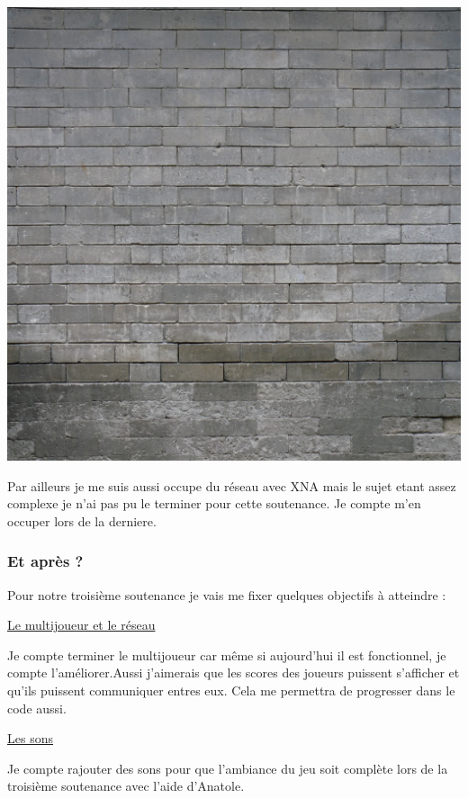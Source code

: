 \documentclass{article}
\begin{document}
\begin{center}
\includegraphics[scale=0.5]{mur_brique.png}
\end{center}
\par
Par ailleurs je me suis aussi occupe du réseau avec XNA mais le sujet etant assez complexe je n'ai pas pu le terminer pour cette soutenance. Je compte m'en occuper lors de la derniere.
\subsubsection{Et après ?}
\par
Pour notre troisième soutenance je vais me fixer quelques objectifs à atteindre :
\newline

\par
\underline{Le multijoueur et le réseau}
\newline
\par
Je compte terminer le multijoueur car même si aujourd'hui il est fonctionnel, je compte l'améliorer.Aussi j'aimerais que les scores des joueurs puissent s'afficher et qu'ils puissent communiquer entres eux. Cela me permettra de progresser dans le code aussi.
\newline

\par
\underline{Les sons}
\newline
\par
Je compte rajouter des sons pour que l'ambiance du jeu soit complète lors de la troisième soutenance avec l’aide d’Anatole.
\newline
\end{document}
